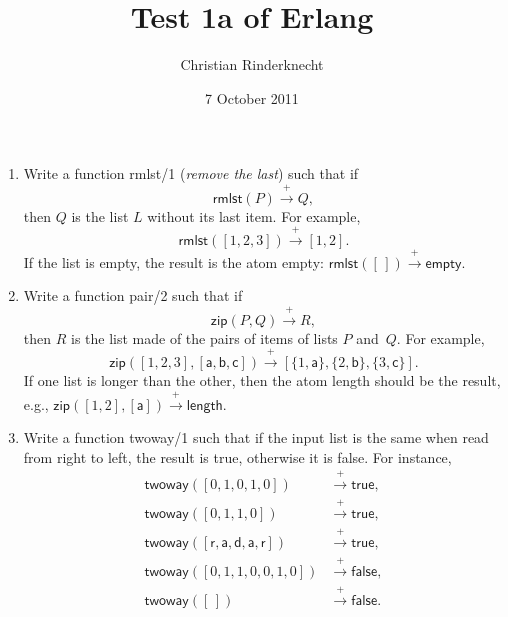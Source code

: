 \documentclass[11pt,a4paper]{article}
\title{Test 1a of \textsf{Erlang}}
\author{Christian Rinderknecht}
\date{7 October 2011}
\newcommand\fun[1]{\textsf{#1}}
\begin{document}
\maketitle

\thispagestyle{empty}

\begin{enumerate}

  \item Write a function \fun{rmlst/1} (\emph{remove the last}) such
    that if \[\fun{rmlst}(P) \xrightarrow{+} Q,\] then \(Q\) is the
    list \(L\) without its last item. For example,
    \[\fun{rmlst}([1,2,3]) \xrightarrow{+} [1,2].\] If the list is
    empty, the result is the atom \fun{empty}: \(\fun{rmlst}([\,])
    \xrightarrow{+} \fun{empty}\).

  \item Write a function \fun{pair/2} such that if \[\fun{zip}(P,Q)
    \xrightarrow{+} R,\] then \(R\) is the list made of the pairs of
    items of lists \(P\) and~\(Q\). For example,
    \[\fun{zip}([1,2,3],[\fun{a},\fun{b},\fun{c}]) \xrightarrow{+}
          [\{1,\fun{a}\}, \{2,\fun{b}\}, \{3,\fun{c}\}].\] If one list
          is longer than the other, then the atom \fun{length} should
          be the result, e.g., \(\fun{zip}([1,2],[\fun{a}])
          \xrightarrow{+} \fun{length}\).

  \item Write a function \fun{twoway/1} such that if the input list
    is the same when read from right to left, the result is
    \fun{true}, otherwise it is \fun{false}. For instance,
    \begin{align*}
      \fun{twoway}([0,1,0,1,0]) &\xrightarrow{+} \fun{true},\\
      \fun{twoway}([0,1,1,0]) &\xrightarrow{+} \fun{true},\\
      \fun{twoway}([\fun{r},\fun{a},\fun{d},\fun{a},\fun{r}])
      &\xrightarrow{+} \fun{true},\\
      \fun{twoway}([0,1,1,0,0,1,0]) &\xrightarrow{+} \fun{false},\\
      \fun{twoway}([\,]) &\xrightarrow{+} \fun{false}.
    \end{align*}

\end{enumerate}
\end{document}
